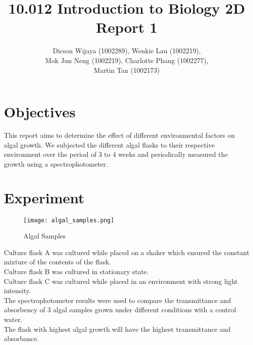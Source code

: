 \documentclass[12pt,a4paper]{article}
\author{Dicson Wijaya (1002289), Wenkie Lau (1002219), \\ Mok Jun Neng (1002219), Charlotte Phang (1002277), \\ Martin Tan (1002173)}
\title{10.012 Introduction to Biology 2D Report 1}
\begin{document}
	
	\maketitle
	
	\section{Objectives}
	This report aims to determine the effect of different environmental factors on algal growth. We subjected the different algal flasks to their respective environment over the period of 3 to 4 weeks and periodically measured the growth using a spectrophotometer.
	
	\section{Experiment}
	\begin{figure}[H]
		\begin{center}
			\texttt{[image: algal\_samples.png]}
			\caption{Algal Samples}
			\label{fig:algalsamples}
		\end{center}
	\end{figure}
    Culture flask A was cultured while placed on a shaker which ensured the constant mixture of the contents of the flask. \\
    
    Culture flask B was cultured in stationary state. \\
    
    Culture flask C was cultured while placed in an environment with strong light intensity. \\
    
    The spectrophotometer results were used to compare the transmittance and absorbency of 3 algal samples grown under different conditions with a control water. \\
    
    The flask with highest algal growth will have the highest transmittance and absorbance.
    
\end{document}
